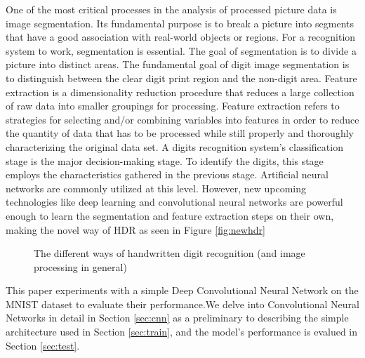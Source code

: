 \documentclass[conference]{IEEEtran}
\begin{document}
One of the most critical processes in the analysis of processed picture data is image segmentation. Its fundamental purpose is to break a picture into segments that have a good association with real-world objects or regions. For a recognition system to work, segmentation is essential. The goal of segmentation is to divide a picture into distinct areas. The fundamental goal of digit image segmentation is to distinguish between the clear digit print region and the non-digit area.
Feature extraction is a dimensionality reduction procedure that reduces a large collection of raw data into smaller groupings for processing. Feature extraction refers to strategies for selecting and/or combining variables into features in order to reduce the quantity of data that has to be processed while still properly and thoroughly characterizing the original data set.
A digits recognition system's classification stage is the major decision-making stage. To identify the digits, this stage employs the characteristics gathered in the previous stage. Artificial neural networks are commonly utilized at this level\cite{Singh2011DIGITRS}.
However, new upcoming technologies like deep learning and convolutional neural networks are powerful enough to learn the segmentation and feature extraction steps on their own, making the novel way of HDR as seen in Figure \ref{fig:newhdr}
\begin{figure}[!htp]
    \centering
    \caption{The different ways of handwritten digit recognition (and image processing in general)}\label{fig:bothhdr}
\end{figure}
This paper experiments with a simple Deep Convolutional Neural Network on the MNIST\cite{6296535} dataset to evaluate their performance.\@ We delve into Convolutional Neural Networks in detail in Section \ref{sec:cnn} as a preliminary to describing the simple architecture used in Section \ref{sec:train}, and the model's performance is evalued in Section \ref{sec:test}.
\end{document}
